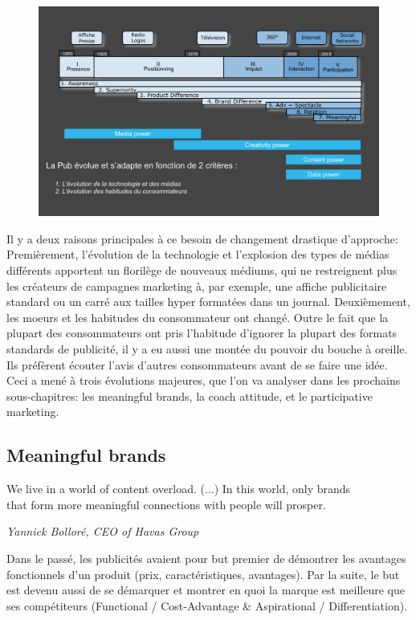 \begin{figure}[H]
\hspace{-0.5cm}
\includegraphics[scale=0.30]{../images/lec2img1}
\end{figure}

Il y a deux raisons principales à ce besoin de changement drastique d'approche: Premièrement, l'évolution de la technologie et l'explosion des types de médias différents apportent un florilège de nouveaux médiums, qui ne restreignent plus les créateurs de campagnes marketing à, par exemple, une affiche publicitaire standard ou un carré aux tailles hyper formatées dans un journal. Deuxièmement, les moeurs et les habitudes du consommateur ont changé. Outre le fait que la plupart des consommateurs ont pris l'habitude d'ignorer la plupart des formats standards de publicité, il y a eu aussi une montée du pouvoir du bouche à oreille. Ils préfèrent écouter l'avis d'autres consommateurs avant de se faire une idée. \\

Ceci a mené à trois évolutions majeures, que l'on va analyser dans les prochains sous-chapitres: les meaningful brands, la coach attitude, et le participative marketing.

\subsection{Meaningful brands}

\epigraph{We live in a world of content overload. (...) In this world, only brands \\that form more meaningful connections with people will prosper.}{\textit{Yannick Bolloré, CEO of Havas Group}}

Dans le passé, les publicités avaient pour but premier de démontrer les avantages fonctionnels d'un produit (prix, caractéristiques, avantages). Par la suite, le but est devenu aussi de se démarquer et montrer en quoi la marque est meilleure que ses compétiteurs (Functional / Cost-Advantage \& Aspirational / Differentiation).\\

